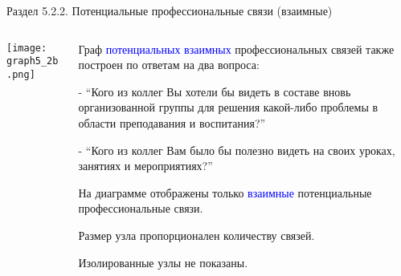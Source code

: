 \begin{frame}{Раздел 5.2.2. Потенциальные профессиональные связи (взаимные)}

\begin{columns} 
\begin{column}{0.75\textwidth}
\centering
          \texttt{[image: graph5\_2b.png]}
\end{column}
\begin{column}{0.25\textwidth} 

\tiny
Граф \textcolor{blue}{потенциальных взаимных} профессиональных связей также построен по ответам на два вопроса:
\smallskip

- ``Кого из коллег Вы хотели бы видеть в составе вновь организованной группы для решения какой-либо проблемы в области преподавания и воспитания?''
\smallskip

- ``Кого из коллег Вам было бы полезно видеть на своих уроках, занятиях и мероприятиях?''
\smallskip

На диаграмме отображены только \textcolor{blue}{взаимные} потенциальные профессиональные связи.
\smallskip

Размер узла пропорционален количеству связей.
\smallskip

Изолированные узлы не показаны.

\end{column}
\end{columns}
\end{frame}


